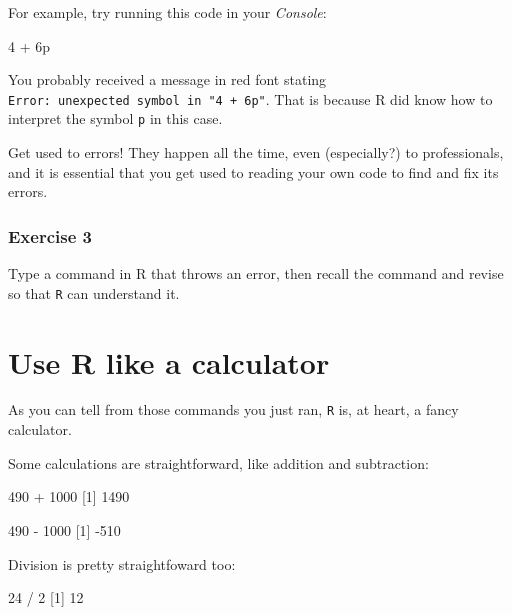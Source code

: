 \documentclass[
]{book}
\newenvironment{Shaded}{\begin{snugshade}}{\end{snugshade}}
\newcommand{\DecValTok}[1]{\textcolor[rgb]{0.00,0.00,0.81}{#1}}
\newcommand{\NormalTok}[1]{#1}
\newcommand{\SpecialCharTok}[1]{\textcolor[rgb]{0.00,0.00,0.00}{#1}}
\begin{document}
For example, try running this code in your \emph{Console}:

\begin{Shaded}
\begin{Highlighting}[]
\DecValTok{4} \SpecialCharTok{+}\NormalTok{ 6p}
\end{Highlighting}
\end{Shaded}

You probably received a message in red font stating \texttt{Error:\ unexpected\ symbol\ in\ "4\ +\ 6p"}. That is because R did know how to interpret the symbol \texttt{p} in this case.

Get used to errors! They happen all the time, even (especially?) to professionals, and it is essential that you get used to reading your own code to find and fix its errors.

\hypertarget{exercise-3}{%
\subsubsection*{Exercise 3}\label{exercise-3}}

Type a command in R that throws an error, then recall the command and revise so that \texttt{R} can understand it.

\hypertarget{use-r-like-a-calculator}{%
\section*{Use R like a calculator}\label{use-r-like-a-calculator}}

As you can tell from those commands you just ran, \texttt{R} is, at heart, a fancy calculator.

Some calculations are straightforward, like addition and subtraction:

\begin{Shaded}
\begin{Highlighting}[]
\DecValTok{490} \SpecialCharTok{+} \DecValTok{1000}
\NormalTok{[}\DecValTok{1}\NormalTok{] }\DecValTok{1490}

\DecValTok{490} \SpecialCharTok{{-}} \DecValTok{1000}
\NormalTok{[}\DecValTok{1}\NormalTok{] }\SpecialCharTok{{-}}\DecValTok{510}
\end{Highlighting}
\end{Shaded}

Division is pretty straightfoward too:

\begin{Shaded}
\begin{Highlighting}[]
\DecValTok{24} \SpecialCharTok{/} \DecValTok{2}
\NormalTok{[}\DecValTok{1}\NormalTok{] }\DecValTok{12}
\end{Highlighting}
\end{Shaded}
\end{document}

